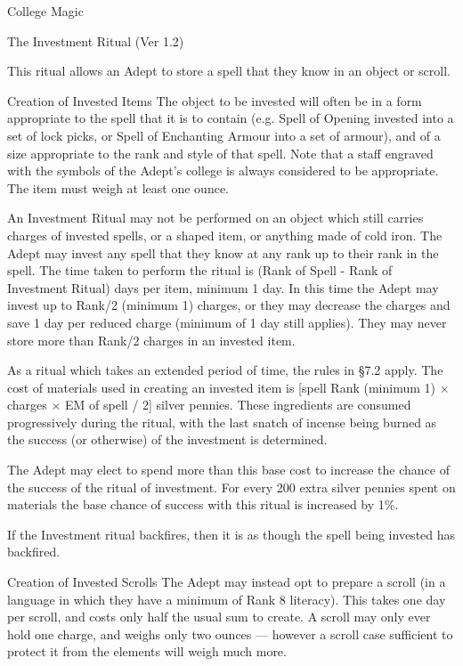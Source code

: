 \begin{Chapter}{College Magic}
\begin{ritual}{The Investment Ritual (Ver 1.2)}

\begin{effects}
This ritual allows an Adept to store a spell that they know in an
object or scroll.

\begin{Description}
\item[Creation of Invested Items] The object to be invested will often
  be in a form appropriate to the spell that it is to contain (e.g.
  Spell of Opening invested into a set of lock picks, or Spell of
  Enchanting Armour into a set of armour), and of a size appropriate
  to the rank and style of that spell.  Note that a staff engraved
  with the symbols of the Adept’s college is always considered to be
  appropriate. The item must weigh at least one ounce.

An Investment Ritual may not be performed on an object which still
carries charges of invested spells, or a shaped item, or anything made
of cold iron.  The Adept may invest any spell that they know at any
rank up to their rank in the spell.  The time taken to perform the
ritual is (Rank of Spell - Rank of Investment Ritual) days per item,
minimum 1 day.  In this time the Adept may invest up to Rank/2
(minimum 1) charges, or they may decrease the charges and save 1 day
per reduced charge (minimum of 1 day still applies). They may never
store more than Rank/2 charges in an invested item.

As a ritual which takes an extended period of time, the rules in §7.2
apply. The cost of materials used in creating an invested item is
[spell Rank (minimum 1) × charges × EM of spell / 2] silver pennies.
These ingredients are consumed progressively during the ritual, with
the last snatch of incense being burned as the success (or otherwise)
of the investment is determined.

The Adept may elect to spend more than this base cost to increase the
chance of the success of the ritual of investment.  For every 200
extra silver pennies spent on materials the base chance of success
with this ritual is increased by 1\%.

If the Investment ritual backfires, then it is as though the spell
being invested has backfired.

\item[Creation of Invested Scrolls] The Adept may instead opt to
  prepare a scroll (in a language in which they have a minimum of Rank
  8 literacy).  This takes one day per scroll, and costs only half the
  usual sum to create.  A scroll may only ever hold one charge, and
  weighs only two ounces — however a scroll case sufficient to protect
  it from the elements will weigh much more.


\end{Description}
\end{effects}
\end{ritual}
\end{Chapter}
